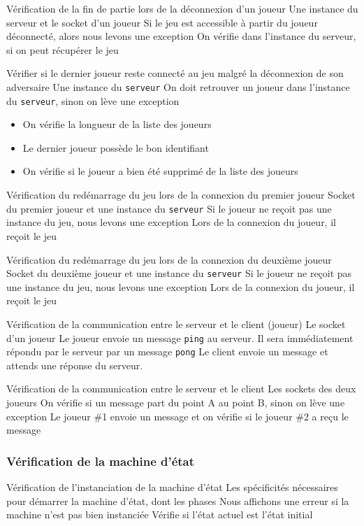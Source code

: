\mytest
{Vérification de la fin de partie lors de la déconnexion d'un joueur}
{Une instance du serveur et le socket d'un joueur}
{Si le jeu est accessible à partir du joueur déconnecté, alors nous levons une exception}
{On vérifie dans l'instance du serveur, si on peut récupérer le jeu}

\mytest
{Vérifier si le dernier joueur reste connecté au jeu malgré la déconnexion de son adversaire}
{Une instance du \texttt{serveur}}
{On doit retrouver un joueur dans l'instance du \texttt{serveur}, sinon on lève une exception}
{
    \begin{itemize}
        \item On vérifie la longueur de la liste des joueurs
        \item Le dernier joueur possède le bon identifiant
        \item On vérifie si le joueur a bien été supprimé de la liste des joueurs 
    \end{itemize}
}

\mytest
{Vérification du redémarrage du jeu lors de la connexion du premier joueur}
{Socket du premier joueur et une instance du \texttt{serveur}}
{Si le joueur ne reçoit pas une instance du jeu, nous levons une exception}
{Lors de la connexion du joueur, il reçoit le jeu}

\mytest
{Vérification du redémarrage du jeu lors de la connexion du deuxième joueur}
{Socket du deuxième joueur et une instance du \texttt{serveur}}
{Si le joueur ne reçoit pas une instance du jeu, nous levons une exception}
{Lors de la connexion du joueur, il reçoit le jeu}

\mytest
{Vérification de la communication entre le serveur et le client (joueur)}
{Le socket d'un joueur}
{Le joueur envoie un message \texttt{ping} au serveur. Il sera immédiatement répondu par le serveur par un message \texttt{pong}}
{Le client envoie un message et attends une réponse du serveur.}

\mytest
{Vérification de la communication entre le serveur et le client}
{Les sockets des deux joueurs}
{On vérifie si un message part du point A au point B, sinon on lève une exception}
{Le joueur \#1 envoie un message  et on vérifie si le joueur \#2 a reçu le message}

\subsubsection{Vérification de la machine d'état}
\mytest
{Vérification de l'instanciation de la machine d'état}
{Les spécificités nécessaires pour démarrer la machine d'état, dont les phases}
{Nous affichons une erreur si la machine n'est pas bien instanciée}
{Vérifie si l'état actuel est l'état initial}

